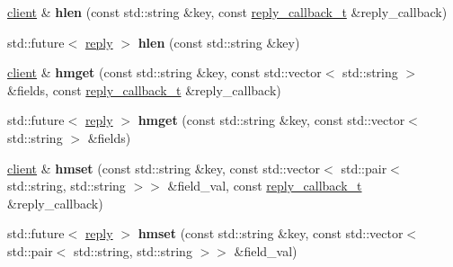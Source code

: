 \begin{DoxyCompactItemize}
\item 
\mbox{\label{classcpp__redis_1_1client_a88b88d74f77f2a59bc75b7d1fcdbd483}} 
\hyperlink{classcpp__redis_1_1client}{client} \& {\bfseries hlen} (const std\+::string \&key, const \hyperlink{classcpp__redis_1_1client_a061a1140d36d2eaeda82b09a0bb3f9f2}{reply\+\_\+callback\+\_\+t} \&reply\+\_\+callback)
\item 
\mbox{\label{classcpp__redis_1_1client_a34b5783e7392f29dd26c6e114d535221}} 
std\+::future$<$ \hyperlink{classcpp__redis_1_1reply}{reply} $>$ {\bfseries hlen} (const std\+::string \&key)
\item 
\mbox{\label{classcpp__redis_1_1client_aac28715b6b151dd96ddb760fcc490c3c}} 
\hyperlink{classcpp__redis_1_1client}{client} \& {\bfseries hmget} (const std\+::string \&key, const std\+::vector$<$ std\+::string $>$ \&fields, const \hyperlink{classcpp__redis_1_1client_a061a1140d36d2eaeda82b09a0bb3f9f2}{reply\+\_\+callback\+\_\+t} \&reply\+\_\+callback)
\item 
\mbox{\label{classcpp__redis_1_1client_a8e3af68988204e491ada35efaaf9b247}} 
std\+::future$<$ \hyperlink{classcpp__redis_1_1reply}{reply} $>$ {\bfseries hmget} (const std\+::string \&key, const std\+::vector$<$ std\+::string $>$ \&fields)
\item 
\mbox{\label{classcpp__redis_1_1client_a8c5f96c6e663d89aa18baba495872cfb}} 
\hyperlink{classcpp__redis_1_1client}{client} \& {\bfseries hmset} (const std\+::string \&key, const std\+::vector$<$ std\+::pair$<$ std\+::string, std\+::string $>$$>$ \&field\+\_\+val, const \hyperlink{classcpp__redis_1_1client_a061a1140d36d2eaeda82b09a0bb3f9f2}{reply\+\_\+callback\+\_\+t} \&reply\+\_\+callback)
\item 
\mbox{\label{classcpp__redis_1_1client_acbb8d8fa40a64a155e19e49aae12f117}} 
std\+::future$<$ \hyperlink{classcpp__redis_1_1reply}{reply} $>$ {\bfseries hmset} (const std\+::string \&key, const std\+::vector$<$ std\+::pair$<$ std\+::string, std\+::string $>$$>$ \&field\+\_\+val)
\item 
\mbox{\label{classcpp__redis_1_1client_a982be06bd7f06cad392453697980b49e}} 

\end{DoxyCompactItemize}
